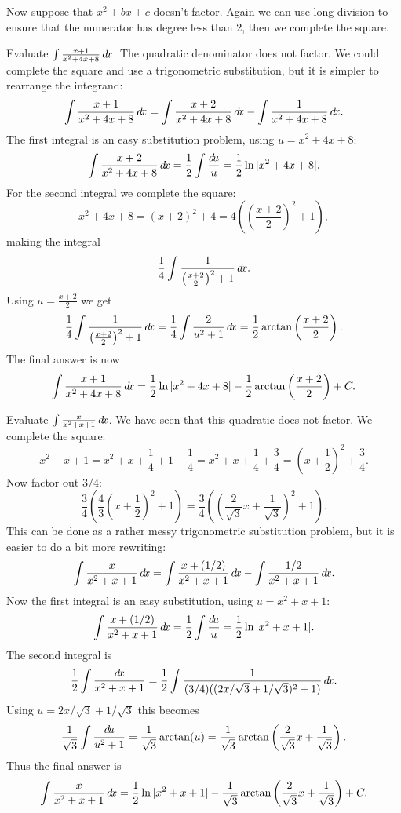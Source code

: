 \documentclass{ximera}
\begin{document}
Now suppose that $x^2+bx+c$ doesn't factor. Again we can use long
division to ensure that the numerator has degree less than 2, then we
complete the square.

\begin{example} 
Evaluate $\int \frac{x+1}{x^2+4x+8}\mathop{}\!d\! x$. The quadratic denominator
does not factor. We could complete the square and use a trigonometric
substitution, but it is simpler to rearrange the integrand:
\[
  \int \frac{x+1}{x^2+4x+8}\mathop{}\!d\! x = \int \frac{x+2}{x^2+4x+8}\mathop{}\!d\! x -
  \int \frac{1}{x^2+4x+8}\mathop{}\!d\! x.
\]
The first integral is an easy substitution problem, using $u=x^2+4x+8$:
\[
  \int \frac{x+2}{x^2+4x+8}\mathop{}\!d\! x=\frac{1}{2}\int \frac{\mathop{}\!d\! u}{u}=
  \frac{1}{2}\ln|x^2+4x+8|.
\]
For the second integral we complete the square:
\[
  x^2+4x+8=(x+2)^2+4=4\left(\left(\frac{x+2}{2}\right)^2+1\right),
\]
making the integral
\[
  \frac{1}{4}\int \frac{1}{\left(\frac{x+2}{2}\right)^2+1}\mathop{}\!d\! x.
\]
Using $u=\frac{x+2}{2}$ we get
\[
  \frac{1}{4}\int \frac{1}{\left(\frac{x+2}{2}\right)^2+1}\mathop{}\!d\! x=
  \frac{1}{4}\int \frac{2}{u^2+1}\mathop{}\!d\! x=
  \frac{1}{2}\arctan\left(\frac{x+2}{2}\right).
\]
The final answer is now 
\[
  \int \frac{x+1}{x^2+4x+8}\mathop{}\!d\! x=\frac{1}{2}\ln|x^2+4x+8|-
  \frac{1}{2}\arctan\left(\frac{x+2}{2}\right)+C.
\]
\end{example}

\begin{example}
Evaluate $\int \frac{x}{x^2+x+1}\mathop{}\!d\! x$. We have seen that this
quadratic does not factor. We complete the square:
\[
  x^2+x+1=x^2+x+\frac{1}{4} + 1 -\frac{1}{4}=x^2+x+\frac{1}{4}+\frac{3}{4}=
  \left(x+\frac{1}{2}\right)^2+\frac{3}{4}.
\]
Now factor out $3/4$:
\[
  \frac{3}{4}\left(\frac{4}{3}\left(x+\frac{1}{2}\right)^2+1\right)
  =\frac{3}{4}\left(\left(\frac{2}{\sqrt{3}}x+\frac{1}{\sqrt3}\right)^2+1\right).
\]
This can be done as a rather messy trigonometric substitution problem,
but it is easier to do a bit more rewriting:
\[
  \int \frac{x}{x^2+x+1}\mathop{}\!d\! x=\int\frac{x+(1/2)}{x^2+x+1}\mathop{}\!d\! x-
  \int\frac{1/2}{x^2+x+1}\mathop{}\!d\! x.
\]
Now the first integral is an easy substitution, using $u=x^2+x+1$:
\[
  \int \frac{x+(1/2)}{x^2+x+1}\mathop{}\!d\! x=\frac{1}{2}\int \frac{\mathop{}\!d\! u}{u}=
  \frac{1}{2}\ln|x^2+x+1|.
\]
The second integral is 
\[
  \frac{1}{2}\int\frac{\mathop{}\!d\! x}{x^2+x+1}=
  \frac{1}{2}\int\frac{1}{(3/4)((2x/\sqrt3+1/\sqrt3)^2+1)}\mathop{}\!d\! x.
\]
Using $u=2x/\sqrt3+1/\sqrt3$ this becomes
\[
  \frac{1}{\sqrt3}\int\frac{\mathop{}\!d\! u}{u^2+1}=\frac{1}{\sqrt3}\arctan(u)=
  \frac{1}{\sqrt3}\arctan\left(\frac{2}{\sqrt3}x+\frac{1}{\sqrt3}\right).
\]
Thus the final answer is
\[
  \int \frac{x}{x^2+x+1}\mathop{}\!d\! x = \frac{1}{2}\ln|x^2+x+1|-
  \frac{1}{\sqrt3}\arctan\left(\frac{2}{\sqrt3}x+\frac{1}{\sqrt3}\right)+C.
\]
\end{example}
\end{document}
